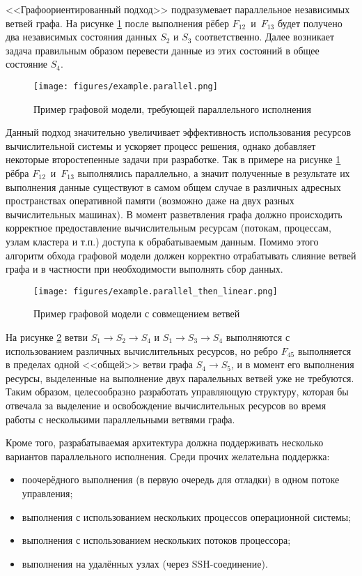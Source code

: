 <<Графоориентированный подход>> подразумевает параллельное независимых ветвей графа. На рисунке \ref{fig:parallelExample} после выполнения рёбер $F_{12}$~и~$F_{13}$ будет получено два независимых состояния данных $S_2$ и $S_3$ соответственно. Далее возникает задача правильным образом перевести данные из этих состояний в общее состояние $S_4$.
\begin{figure}[!ht]
    \centering
    \texttt{[image: figures/example.parallel.png]}
    \caption{Пример графовой модели, требующей параллельного исполнения}
    \label{fig:parallelExample}
\end{figure}

Данный подход значительно увеличивает эффективность использования ресурсов вычислительной системы и ускоряет процесс решения, однако добавляет некоторые второстепенные задачи при разработке. Так в примере на рисунке \ref{fig:parallelExample} рёбра $F_{12}$~и~$F_{13}$ выполнялись параллельно, а значит полученные в результате их выполнения данные существуют в самом общем случае в различных адресных пространствах оперативной памяти (возможно даже на двух разных вычислительных машинах). В момент разветвления графа должно происходить корректное предоставление вычислительным ресурсам (потокам, процессам, узлам кластера и т.п.) доступа к обрабатываемым данным. Помимо этого алгоритм обхода графовой модели должен корректно отрабатывать слияние ветвей графа и в частности при необходимости выполнять сбор данных.

\begin{figure}[!ht]
    \centering
    \texttt{[image: figures/example.parallel\_then\_linear.png]}
    \caption{Пример графовой модели с совмещением ветвей}
    \label{fig:parallelThenLinearExample}
\end{figure}

На рисунке \ref{fig:parallelThenLinearExample} ветви $S_1 \rightarrow S_2 \rightarrow S_4$ и $S_1 \rightarrow S_3 \rightarrow S_4$ выполняются с использованием различных вычислительных ресурсов, но ребро $F_{45}$ выполняется в пределах одной <<общей>> ветви графа $S_4 \rightarrow S_5$, и в момент его выполнения ресурсы, выделенные на выполнение двух паралельных ветвей уже не требуются. Таким образом, целесообразно разработать управляющую структуру, которая бы отвечала за выделение и освобождение вычислительных ресурсов во время работы с несколькими параллельными ветвями графа.

Кроме того, разрабатываемая архитектура должна поддерживать несколько вариантов параллельного исполнения. Среди прочих желательна поддержка:
\begin{itemize}
    \item поочерёдного выполнения (в первую очередь для отладки) в одном потоке управления;
    \item выполнения с использованием нескольких процессов операционной системы;
    \item выполнения с использованием нескольких потоков процессора;
    \item выполнения на удалённых узлах (через SSH-соединение).
\end{itemize}

